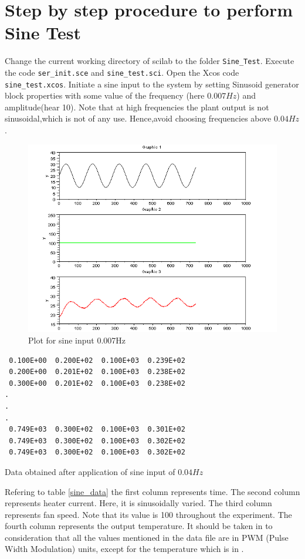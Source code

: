 \section{Step by step procedure to perform Sine Test}
Change the current working directory of scilab to the folder {\tt Sine\_Test}. Execute the code {\tt ser\_init.sce} and {\tt sine\_test.sci}. Open the Xcos code {\tt sine\_test.xcos}. Initiate a sine input to the system by setting Sinusoid generator block properties with some value of the frequency  (here $0.007Hz$) and amplitude(hear 10). Note that at high frequencies the plant output is not sinusoidal,which is not of any use. Hence,avoid choosing frequencies above $0.04Hz$.

\begin{figure}
\includegraphics[width=\linewidth]{sinetest_manual/sine_resp.png}
\caption{Plot for sine input 0.007Hz}
\label{fig:scope}
\end{figure}
\begin{table}

\begin{verbatim}
 0.100E+00  0.200E+02  0.100E+03  0.239E+02
 0.200E+00  0.201E+02  0.100E+03  0.238E+02
 0.300E+00  0.201E+02  0.100E+03  0.238E+02
.
.
.
 0.749E+03  0.300E+02  0.100E+03  0.301E+02
 0.749E+03  0.300E+02  0.100E+03  0.302E+02
 0.749E+03  0.300E+02  0.100E+03  0.302E+02
\end{verbatim}
\caption{Data obtained after application of sine input of $0.04Hz$}
\label{sine_data}
\end{table}
Refering to table \ref{sine_data} the first column represents time. The second column represents heater current. Here, it is sinusoidally varied. The third column represents fan speed. Note that its value is 100 throughout the experiment. The fourth column represents the output temperature.
It should be taken in to consideration that all the values mentioned in the data file are in PWM (Pulse Width Modulation) units, except for the temperature which is in \textcelsius. 

